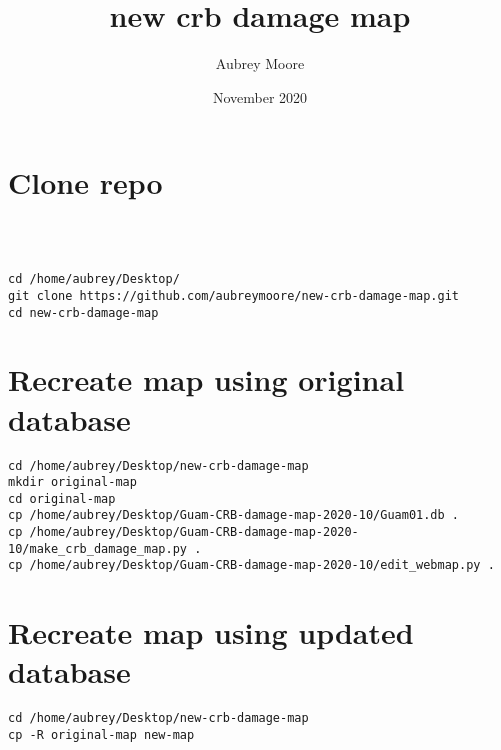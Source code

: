 \documentclass{scrartcl}
\title{new crb damage map}
\author{Aubrey Moore}
\date{November 2020}
\begin{document}
\maketitle

\section{Clone repo}

\begin{verbatim}



cd /home/aubrey/Desktop/
git clone https://github.com/aubreymoore/new-crb-damage-map.git
cd new-crb-damage-map
\end{verbatim}

\section{Recreate map using original database}

\begin{verbatim}
cd /home/aubrey/Desktop/new-crb-damage-map
mkdir original-map
cd original-map
cp /home/aubrey/Desktop/Guam-CRB-damage-map-2020-10/Guam01.db .
cp /home/aubrey/Desktop/Guam-CRB-damage-map-2020-10/make_crb_damage_map.py .
cp /home/aubrey/Desktop/Guam-CRB-damage-map-2020-10/edit_webmap.py .
\end{verbatim}

\section{Recreate map using updated database}

\begin{verbatim}
cd /home/aubrey/Desktop/new-crb-damage-map
cp -R original-map new-map
\end{verbatim}
\end{document}
